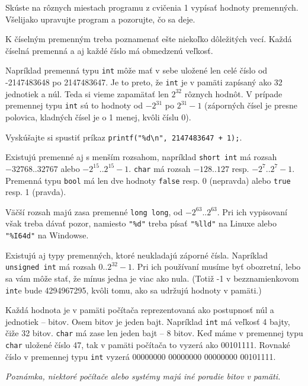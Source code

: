 \cvicenie Skúste na rôznych miestach programu z cvičenia 1 vypísať hodnoty
premenných. Všelijako upravujte program a pozorujte, čo sa deje.
\fakeriesenie


K číselným premenným treba poznamenať ešte niekoľko dôležitých vecí.  Každá
číselná premenná a aj každé číslo má obmedzenú veľkosť.

Napríklad premenná typu \verb!int! môže mať v sebe uložené len celé číslo od
-2147483648 po 2147483647. Je to preto, že \verb!int! je v pamäti zapísaný ako
32 jednotiek a núl. Teda si vieme zapamätať len $2^{32}$ rôznych hodnôt. V
prípade premennej typu \verb!int! sú to hodnoty od $-2^{31}$ po $2^{31}-1$
(záporných čísel je presne polovica, kladných čísel je o 1 menej, kvôli číslu
0).

\cvicenie Vyskúšajte si spustiť príkaz \verb!printf("%d\n", 2147483647 + 1);!.
\fakeriesenie

\medskip

Existujú premenné aj s menším rozsahom, napríklad \verb!short int! má rozsah
$-32768..32767$ alebo $-2^{15}..2^{15}-1$.  \verb!char! má rozsah $-128..127$
resp. $-2^7..2^7-1$. Premenná typu \verb!bool! má len dve hodnoty 
\verb!false! resp. 0 (nepravda) alebo \verb!true! resp. 1 (pravda).

Väčší rozsah majú zasa premenné \verb!long long!, od $-2^{63}..2^{63}$. Pri ich
vypisovaní však treba dávať pozor, namiesto \verb!"%d"! treba písať
\verb!"%lld"! na Linuxe alebo \verb!"%I64d"! na Windowse.

Existujú aj typy premenných, ktoré neukladajú záporné čísla. Napríklad
\verb!unsigned int! má rozsah $0..2^{32}-1$.  Pri ich používaní musíme byť
obozretní, lebo sa vám môže stať, že mínus jedna je viac ako nula.  
(Totiž -1 v bezznamienkovom \verb!int!e bude 4294967295, kvôli tomu, ako sa
udržujú hodnoty v pamäti.)


Každá hodnota je v pamäti počítača reprezentovaná ako postupnosť núl a
jednotiek -- bitov. Osem bitov je jeden bajt. Napríklad \verb!int! má veľkosť 4
bajty, čiže 32 bitov. \verb!char! má zase len jeden bajt -- 8 bitov. Keď máme v
premennej typu \verb!char! uložené číslo 47, tak v pamäti počítača to vyzerá
ako 00101111. Rovnaké číslo v premennej typu \verb!int! vyzerá 00000000
00000000 00000000 00101111. 

\textit{Poznámka, niektoré počítače alebo systémy majú iné poradie bitov v
pamäti.}

